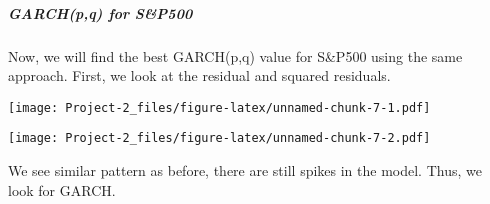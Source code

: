 \documentclass[]{article}
\newenvironment{Shaded}{\begin{snugshade}}{\end{snugshade}}
\newcommand{\KeywordTok}[1]{\textcolor[rgb]{0.13,0.29,0.53}{\textbf{#1}}}
\newcommand{\OperatorTok}[1]{\textcolor[rgb]{0.81,0.36,0.00}{\textbf{#1}}}
\newcommand{\NormalTok}[1]{#1}
\let\oldsubparagraph\subparagraph
\renewcommand{\subparagraph}[1]{\oldsubparagraph{#1}\mbox{}}
\begin{document}
\subparagraph{GARCH(p,q) for S\&P500}\label{garchpq-for-sp500}

Now, we will find the best GARCH(p,q) value for S\&P500 using the same
approach. First, we look at the residual and squared residuals.

\begin{Shaded}
\end{Shaded}

\texttt{[image: Project-2\_files/figure-latex/unnamed-chunk-7-1.pdf]}

\begin{Shaded}
\end{Shaded}

\texttt{[image: Project-2\_files/figure-latex/unnamed-chunk-7-2.pdf]}

We see similar pattern as before, there are still spikes in the model.
Thus, we look for GARCH.
\end{document}
